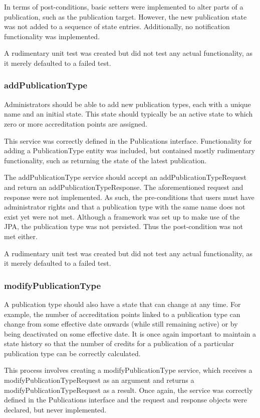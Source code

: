 \documentclass[a4paper,10pt]{article}
\begin{document}
In terms of post-conditions, basic setters were implemented to alter parts of a publication, such as the publication target. However, the new publication state was not added to a sequence of state entries. Additionally, no notification functionality was implemented.

A rudimentary unit test was created but did not test any actual functionality, as it merely defaulted to a failed test.

\subsubsection{addPublicationType}
Administrators should be able to add new publication types, each with a unique name and an initial state. This state should typically be an active state to which zero or more accreditation points are assigned.

This service was correctly defined in the Publications interface. Functionality for adding a PublicationType entity was included, but contained mostly rudimentary functionality, such as returning the state of the latest publication.

The addPublicationType service should accept an addPublicationTypeRequest and return an addPublicationTypeResponse. The aforementioned request and response were not implemented. As such, the pre-conditions that users must have administrator rights and that a publication type with the same name does not exist yet were not met. Although a framework was set up to make use of the JPA, the publication type was not persisted. Thus the post-condition was not met either.

A rudimentary unit test was created but did not test any actual functionality, as it merely defaulted to a failed test.

\subsubsection{modifyPublicationType}
A publication type should also have a state that can change at any time. For example, the number of accreditation points linked to a publication type can change from some effective date onwards (while still remaining active) or by being deactivated on some effective date. It is once again important to maintain a state history so that the number of credits for a publication of a particular publication type can be correctly calculated.

This process involves creating a modifyPublicationType service, which receives a modifyPublicationTypeRequest as an argument and returns a modifyPublicationTypeRequest as a result. Once again, the service was correctly defined in the Publications interface and the request and response objects were declared, but never implemented.
\end{document}
